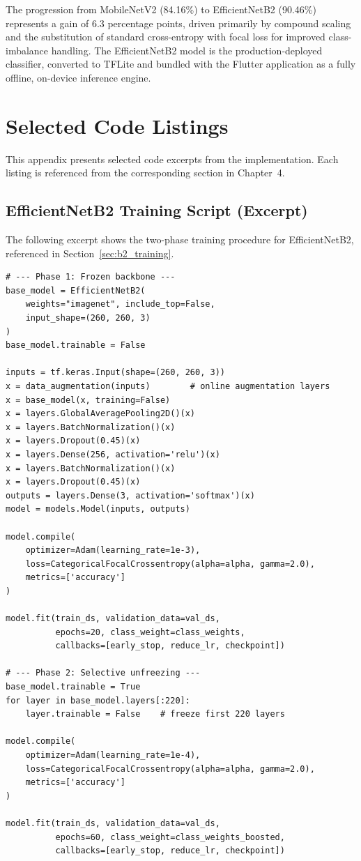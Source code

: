The progression from MobileNetV2 (84.16\%) to EfficientNetB2 (90.46\%) represents a gain of 6.3 percentage points, driven primarily by compound scaling and the substitution of standard cross-entropy with focal loss for improved class-imbalance handling. The EfficientNetB2 model is the production-deployed classifier, converted to TFLite and bundled with the Flutter application as a fully offline, on-device inference engine.


\appendix
\chapter{Selected Code Listings}
\label{app:code}

This appendix presents selected code excerpts from the implementation. Each listing is referenced from the corresponding section in Chapter~4.

\section{EfficientNetB2 Training Script (Excerpt)}
\label{app:training_code}

The following excerpt shows the two-phase training procedure for EfficientNetB2, referenced in Section~\ref{sec:b2_training}.

\begin{verbatim}
# --- Phase 1: Frozen backbone ---
base_model = EfficientNetB2(
    weights="imagenet", include_top=False,
    input_shape=(260, 260, 3)
)
base_model.trainable = False

inputs = tf.keras.Input(shape=(260, 260, 3))
x = data_augmentation(inputs)        # online augmentation layers
x = base_model(x, training=False)
x = layers.GlobalAveragePooling2D()(x)
x = layers.BatchNormalization()(x)
x = layers.Dropout(0.45)(x)
x = layers.Dense(256, activation='relu')(x)
x = layers.BatchNormalization()(x)
x = layers.Dropout(0.45)(x)
outputs = layers.Dense(3, activation='softmax')(x)
model = models.Model(inputs, outputs)

model.compile(
    optimizer=Adam(learning_rate=1e-3),
    loss=CategoricalFocalCrossentropy(alpha=alpha, gamma=2.0),
    metrics=['accuracy']
)

model.fit(train_ds, validation_data=val_ds,
          epochs=20, class_weight=class_weights,
          callbacks=[early_stop, reduce_lr, checkpoint])

# --- Phase 2: Selective unfreezing ---
base_model.trainable = True
for layer in base_model.layers[:220]:
    layer.trainable = False    # freeze first 220 layers

model.compile(
    optimizer=Adam(learning_rate=1e-4),
    loss=CategoricalFocalCrossentropy(alpha=alpha, gamma=2.0),
    metrics=['accuracy']
)

model.fit(train_ds, validation_data=val_ds,
          epochs=60, class_weight=class_weights_boosted,
          callbacks=[early_stop, reduce_lr, checkpoint])
\end{verbatim}

